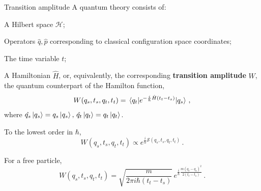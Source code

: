 \documentclass{beamer}
\newcommand\boldtext[1]{\textcolor{bolds}{\textbf{#1}}}
\begin{document}
\begin{frame}{Transition amplitude}
    A quantum theory consists of:
    \begin{list}{\maltese}{\leftmargin=1em \itemindent=0em}
        \item<1-> A Hilbert space $\mathcal{H}$;
        \item<2-> Operators $\hat{q},\hat{p}$ corresponding to classical configuration space coordinates;
        \item<3-> The time variable $t$;
        \item<4-> A Hamiltonian $\hat{H}$, or, equivalently, the corresponding \boldtext{transition amplitude} $W$, the quantum counterpart of the Hamilton function,
        \begin{align}
            W(q_s,t_s,q_t,t_t)=\mel{q_t}{e^{-\frac{i}{\hbar}\hat{H}(t_t-t_s)}}{q_s} \,,
        \end{align}
        where $\hat{q_s}\ket{q_s}=q_s\ket{q_s},\,\hat{q_t}\ket{q_t}=q_t\ket{q_t}$.
        \item<5->[] To the lowest order in $\hbar$,
        \begin{equation}
            W(q_s,t_s,q_t,t_t)\propto e^{\frac{i}{\hbar}\mathcal{S}(q_s,t_s,q_t,t_t)}\,.
        \end{equation}
        \item<6->[] For a free particle,
        \begin{equation}
            W(q_s,t_s,q_t,t_t)=\sqrt{\frac{m}{2\pi i\hbar(t_t-t_s)}}\, e^{\frac{i}{\hbar}\frac{m(q_t-q_s)^2}{2(t_t-t_s)}}\,.
        \end{equation}
    \end{list}
\end{frame}
\end{document}
